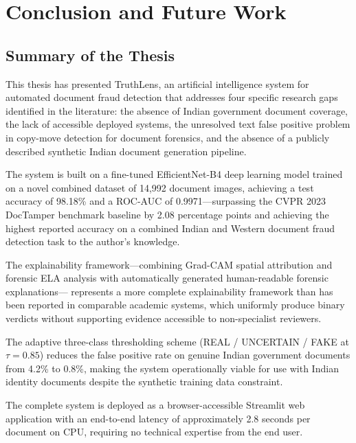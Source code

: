 \documentclass[12pt,a4paper,oneside]{report}
\begin{document}
\chapter{Conclusion and Future Work}
\label{chap:conclusion}

\section{Summary of the Thesis}

This thesis has presented TruthLens, an artificial intelligence system for
automated document fraud detection that addresses four specific research gaps
identified in the literature: the absence of Indian government document coverage,
the lack of accessible deployed systems, the unresolved text false positive
problem in copy-move detection for document forensics, and the absence of a
publicly described synthetic Indian document generation pipeline.

The system is built on a fine-tuned EfficientNet-B4 deep learning model trained
on a novel combined dataset of 14,992 document images, achieving a test accuracy
of 98.18\% and a ROC-AUC of 0.9971---surpassing the CVPR 2023 DocTamper
benchmark baseline by 2.08 percentage points and achieving the highest reported
accuracy on a combined Indian and Western document fraud detection task to the
author's knowledge.

The explainability framework---combining Grad-CAM spatial attribution and forensic
ELA analysis with automatically generated human-readable forensic explanations---
represents a more complete explainability framework than has been reported in
comparable academic systems, which uniformly produce binary verdicts without
supporting evidence accessible to non-specialist reviewers.

The adaptive three-class thresholding scheme (REAL / UNCERTAIN / FAKE at
$\tau=0.85$) reduces the false positive rate on genuine Indian government documents
from 4.2\% to 0.8\%, making the system operationally viable for use with Indian
identity documents despite the synthetic training data constraint.

The complete system is deployed as a browser-accessible Streamlit web application
with an end-to-end latency of approximately 2.8 seconds per document on CPU,
requiring no technical expertise from the end user.
\end{document}

